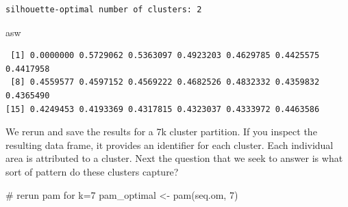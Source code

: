 \documentclass[
  letterpaper,
  DIV=11,
  numbers=noendperiod]{scrreprt}
\newenvironment{Shaded}{\begin{snugshade}}{\end{snugshade}}
\newcommand{\CommentTok}[1]{\textcolor[rgb]{0.37,0.37,0.37}{#1}}
\newcommand{\ControlFlowTok}[1]{\textcolor[rgb]{0.00,0.23,0.31}{#1}}
\newcommand{\DecValTok}[1]{\textcolor[rgb]{0.68,0.00,0.00}{#1}}
\newcommand{\FunctionTok}[1]{\textcolor[rgb]{0.28,0.35,0.67}{#1}}
\newcommand{\NormalTok}[1]{\textcolor[rgb]{0.00,0.23,0.31}{#1}}
\newcommand{\OtherTok}[1]{\textcolor[rgb]{0.00,0.23,0.31}{#1}}
\newcommand{\SpecialCharTok}[1]{\textcolor[rgb]{0.37,0.37,0.37}{#1}}
\newcommand{\StringTok}[1]{\textcolor[rgb]{0.13,0.47,0.30}{#1}}
\begin{document}
\begin{Shaded}
\end{Shaded}

\begin{verbatim}
silhouette-optimal number of clusters: 2 
\end{verbatim}

\begin{Shaded}
\begin{Highlighting}[]
\NormalTok{  asw}
\end{Highlighting}
\end{Shaded}

\begin{verbatim}
 [1] 0.0000000 0.5729062 0.5363097 0.4923203 0.4629785 0.4425575 0.4417958
 [8] 0.4559577 0.4597152 0.4569222 0.4682526 0.4832332 0.4359832 0.4365490
[15] 0.4249453 0.4193369 0.4317815 0.4323037 0.4333972 0.4463586
\end{verbatim}

We rerun and save the results for a 7k cluster partition. If you inspect
the resulting data frame, it provides an identifier for each cluster.
Each individual area is attributed to a cluster. Next the question that
we seek to answer is what sort of pattern do these clusters capture?

\begin{Shaded}
\begin{Highlighting}[]
\CommentTok{\# rerun pam for k=7}
\NormalTok{pam\_optimal }\OtherTok{\textless{}{-}} \FunctionTok{pam}\NormalTok{(seq.om, }\DecValTok{7}\NormalTok{)}
\end{Highlighting}
\end{Shaded}
\end{document}
